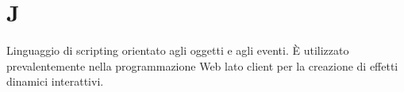 \section{J}

Linguaggio di scripting orientato agli oggetti e agli eventi. È utilizzato prevalentemente nella programmazione Web lato client per la creazione di effetti dinamici interattivi.